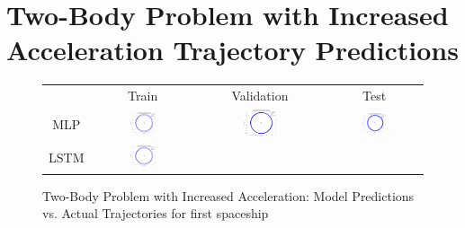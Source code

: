 \documentclass[11pt,a4paper, twocolumn]{article}
\begin{document}
\section{Two-Body Problem with Increased Acceleration Trajectory Predictions}
\label{sec:two_body_acc_predictions}
\begin{figure}[H]
  \centering
  \caption{Two-Body Problem with Increased Acceleration: Model Predictions vs. Actual Trajectories for first spaceship}
  \label{fig:two_body_acc_predictions}
  \begin{tabular}{cccc}
      & Train & Validation & Test \\
      MLP &
      \includegraphics[width=0.27\textwidth]{../inference_results/train/MLP/two_body_force_increased_acceleration/500/full_trajectory_spaceship_0.png} &
      \includegraphics[width=0.27\textwidth]{../inference_results/val/MLP/two_body_force_increased_acceleration/500/full_trajectory_spaceship_0.png} &
      \includegraphics[width=0.27\textwidth]{../inference_results/test/MLP/two_body_force_increased_acceleration/500/full_trajectory_spaceship_0.png} \\
      LSTM &
      \includegraphics[width=0.27\textwidth]{../inference_results/train/LSTM/two_body_force_increased_acceleration/500/full_trajectory_spaceship_0.png} &

\end{tabular}
\end{figure}
\end{document}
